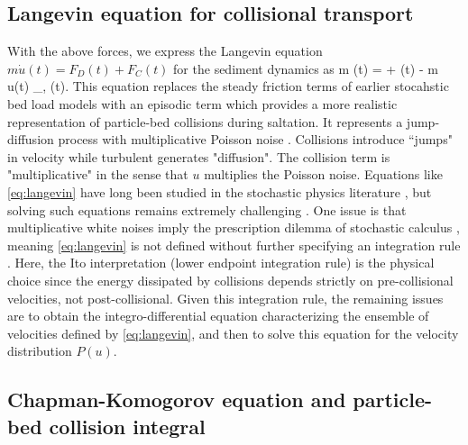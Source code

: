\subsection{Langevin equation for collisional transport}

With the above forces, we express the Langevin equation $m\dot{u}(t) = F_D(t) + F_C(t)$ for the sediment dynamics as
\be m (t) = \Gamma + \eta(t) - m u(t) \xi_{\nu, \ve}(t). \label{eq:langevin} \ee
This equation replaces the steady friction terms of earlier stocahstic bed load models with an episodic term which provides a more realistic representation of particle-bed collisions during saltation.
It represents a jump-diffusion process \citep{Daly2006} with multiplicative Poisson noise \citep{Dubkov2016,Denisov2009}. 
Collisions introduce ``jumps" in velocity while turbulent generates "diffusion".
The collision term is "multiplicative" in the sense that $u$ multiplies the Poisson noise.
Equations like \ref{eq:langevin} have long been studied in the stochastic physics literature \citep{Hanggi1978,VanDenBroeck1983}, but solving such equations remains extremely challenging \citep{Luczka1995,Daly2010,Mau2014,Dubkov2019}.
One issue is that multiplicative white noises imply the prescription dilemma of stochastic calculus \citep{Risken1989,Gardiner1983}, meaning \ref{eq:langevin} is not defined without further specifying an integration rule \citep{Suweis2011}.
Here, the Ito interpretation (lower endpoint integration rule) is the physical choice since the energy dissipated by collisions depends strictly on pre-collisional velocities, not post-collisional.
Given this integration rule, the remaining issues are to obtain the integro-differential equation characterizing the ensemble of velocities defined by \ref{eq:langevin}, and then to solve this equation for the velocity distribution $P(u)$.

\subsection{Chapman-Komogorov equation and particle-bed collision integral}

